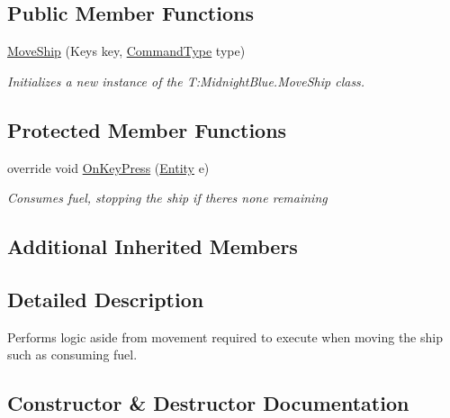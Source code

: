 \subsection*{Public Member Functions}
\begin{DoxyCompactItemize}
\item 
\hyperlink{class_midnight_blue_1_1_move_ship_a7c3de7f43d19cde694040c71a5ee5fa0}{Move\+Ship} (Keys key, \hyperlink{namespace_midnight_blue_1_1_engine_1_1_i_o_a8bc3f159399ecadd590f7df1b54354b0}{Command\+Type} type)
\begin{DoxyCompactList}\small\item\em Initializes a new instance of the T\+:\+Midnight\+Blue.\+Move\+Ship class. \end{DoxyCompactList}\end{DoxyCompactItemize}
\subsection*{Protected Member Functions}
\begin{DoxyCompactItemize}
\item 
override void \hyperlink{class_midnight_blue_1_1_move_ship_ac4b3dcb62954548f27bad5e5d6a00cdf}{On\+Key\+Press} (\hyperlink{class_midnight_blue_1_1_engine_1_1_entity_component_1_1_entity}{Entity} e)
\begin{DoxyCompactList}\small\item\em Consumes fuel, stopping the ship if there\textquotesingle{}s none remaining \end{DoxyCompactList}\end{DoxyCompactItemize}
\subsection*{Additional Inherited Members}


\subsection{Detailed Description}
Performs logic aside from movement required to execute when moving the ship such as consuming fuel. 



\subsection{Constructor \& Destructor Documentation}
\hypertarget{class_midnight_blue_1_1_move_ship_a7c3de7f43d19cde694040c71a5ee5fa0}{}\label{class_midnight_blue_1_1_move_ship_a7c3de7f43d19cde694040c71a5ee5fa0} 
